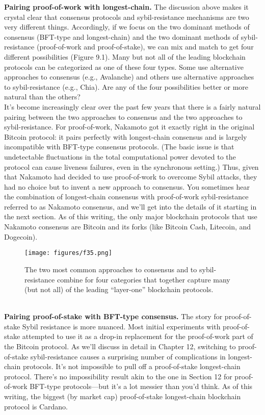\noindent
\textbf{Pairing proof-of-work with longest-chain.} The discussion above makes it
crystal clear that consensus protocols and sybil-resistance mechanisms are two very different
things. Accordingly, if we focus on the two dominant methods of consensus (BFT-type and
longest-chain) and the two dominant methods of sybil-resistance (proof-of-work and proof-of-stake), we can mix and match to get four different possibilities (Figure 9.1). Many but not all of the leading blockchain protocols can be categorized as one of these four types.
Some use alternative approaches to consensus (e.g., Avalanche) and others use alternative approaches to
sybil-resistance (e.g., Chia). Are any of
the four possibilities better or more natural than the others?\\

It’s become increasingly clear over the past few years that there is a fairly natural pairing between the two approaches to consensus and the two approaches to sybil-resistance.
For proof-of-work, Nakamoto got it exactly right in the original Bitcoin protocol: it pairs
perfectly with longest-chain consensus and is largely
incompatible with BFT-type consensus protocols. (The basic issue is that undetectable fluctuations in the total computational power devoted to the
protocol can cause liveness failures, even in the synchronous setting.) Thus, given that Nakamoto had decided to use proof-of-work to overcome Sybil attacks, they had no choice but to invent a
new approach to consensus. You sometimes hear the combination of longest-chain consensus
with proof-of-work sybil-resistance referred to as Nakamoto consensus, and we’ll get into
the details of it starting in the next section. As of this writing, the only major blockchain
protocols that use Nakamoto consensus are Bitcoin and its forks (like Bitcoin Cash, Litecoin,
and Dogecoin).
\begin{figure}[h]
    \centering
    \texttt{[image: figures/f35.png]}
    \caption{The two most common approaches to consensus and to sybil-resistance combine for
four categories that together capture many (but not all) of the leading “layer-one” blockchain
protocols.}
    \label{fig:mesh1}
\end{figure}\\
\noindent
\textbf{Pairing proof-of-stake with BFT-type consensus.} The story for proof-of-stake Sybil resistance is more nuanced. Most initial experiments with proof-of-stake attempted to use it
as a drop-in replacement for the proof-of-work part of the Bitcoin protocol. As we’ll discuss
in detail in Chapter 12, switching to proof-of-stake sybil-resistance causes a surprising number
of complications in longest-chain protocols. It’s not impossible to pull off a proof-of-stake
longest-chain protocol. There’s no impossibility result akin to the one in Section 12 for proof-of-work BFT-type protocols—but it’s a lot messier than you’d think. As of this writing, the
biggest (by market cap) proof-of-stake longest-chain blockchain protocol is Cardano.\\

